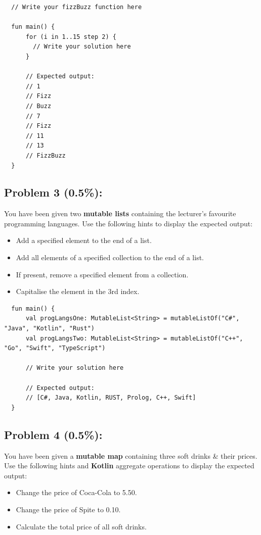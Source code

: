 \documentclass{article}
\begin{document}
\begin{verbatim}
  // Write your fizzBuzz function here
  
  fun main() {
      for (i in 1..15 step 2) {
        // Write your solution here
      }

      // Expected output:
      // 1
      // Fizz
      // Buzz
      // 7
      // Fizz
      // 11
      // 13
      // FizzBuzz
  }
\end{verbatim}

\subsection*{Problem 3 (0.5\%):} You have been given two \textbf{mutable lists} containing the lecturer's favourite programming languages. Use the following hints to display the expected output:
\begin{itemize}
  \item Add a specified element to the end of a list.
  \item Add all elements of a specified collection to the end of a list.
  \item If present, remove a specified element from a collection.
  \item Capitalise the element in the 3rd index.
\end{itemize}

\begin{verbatim}
  fun main() {
      val progLangsOne: MutableList<String> = mutableListOf("C#", "Java", "Kotlin", "Rust")
      val progLangsTwo: MutableList<String> = mutableListOf("C++", "Go", "Swift", "TypeScript")
    
      // Write your solution here
    
      // Expected output:
      // [C#, Java, Kotlin, RUST, Prolog, C++, Swift]
  }
\end{verbatim}

\subsection*{Problem 4 (0.5\%):} You have been given a \textbf{mutable map} containing three soft drinks \& their prices. Use the following hints and \textbf{Kotlin} aggregate operations to display the expected output:
\begin{itemize}
  \item Change the price of Coca-Cola to 5.50.
  \item Change the price of Spite to 0.10.
  \item Calculate the total price of all soft drinks.
\end{itemize}
\end{document}
